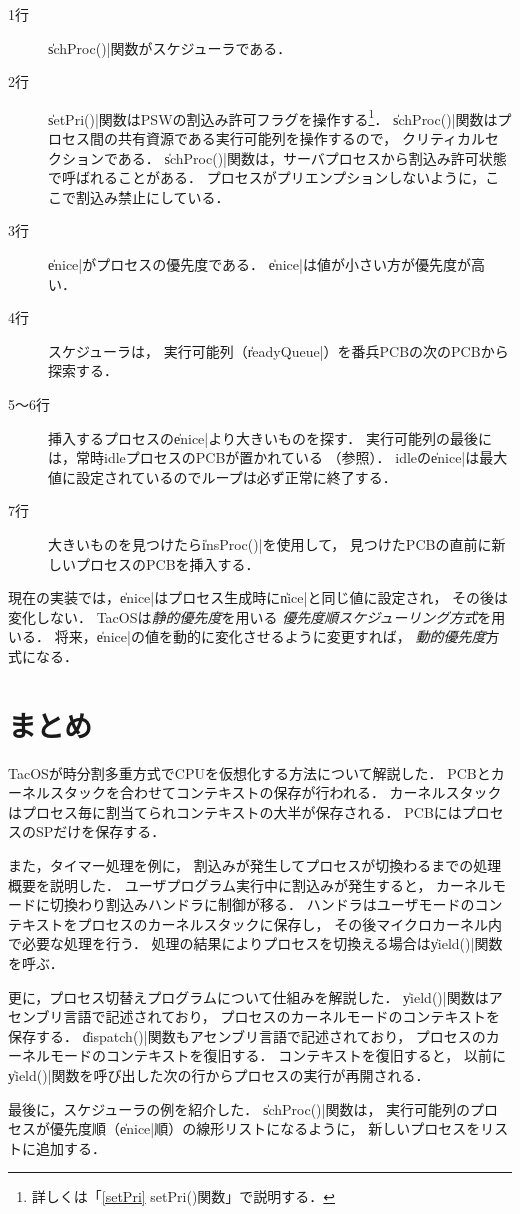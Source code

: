 

\begin{description}
\item[1行] \|schProc()|関数がスケジューラである．
\item[2行] \|setPri()|関数はPSWの割込み許可フラグを操作する\footnote{
  詳しくは「\ref{setPri} setPri()関数」で説明する．}．
  \|schProc()|関数はプロセス間の共有資源である実行可能列を操作するので，
  クリティカルセクションである．
  \|schProc()|関数は，サーバプロセスから割込み許可状態で呼ばれることがある．
  プロセスがプリエンプションしないように，ここで割込み禁止にしている．
\item[3行] \|enice|がプロセスの優先度である．
  \|enice|は値が小さい方が優先度が高い．
\item[4行] スケジューラは，
  実行可能列（\|readyQueue|）を番兵PCBの次のPCBから探索する．
\item[5〜6行] 挿入するプロセスの\|enice|より大きいものを探す．
  実行可能列の最後には，常時idleプロセスのPCBが置かれている
  （参照）．
  idleの\|enice|は最大値に設定されているのでループは必ず正常に終了する．
\item[7行] 大きいものを見つけたら\|insProc()|を使用して，
  見つけたPCBの直前に新しいプロセスのPCBを挿入する．
\end{description}

現在の実装では，\|enice|はプロセス生成時に\|nice|と同じ値に設定され，
その後は変化しない．
TacOSは\emph{静的優先度}を用いる
\emph{優先度順スケジューリング方式}を用いる．
将来，\|enice|の値を動的に変化させるように変更すれば，
\emph{動的優先度}方式になる．

\section{まとめ}
TacOSが時分割多重方式でCPUを仮想化する方法について解説した．
PCBとカーネルスタックを合わせてコンテキストの保存が行われる．
カーネルスタックはプロセス毎に割当てられコンテキストの大半が保存される．
PCBにはプロセスのSPだけを保存する．

また，タイマー処理を例に，
割込みが発生してプロセスが切換わるまでの処理概要を説明した．
ユーザプログラム実行中に割込みが発生すると，
カーネルモードに切換わり割込みハンドラに制御が移る．
ハンドラはユーザモードのコンテキストをプロセスのカーネルスタックに保存し，
その後マイクロカーネル内で必要な処理を行う．
処理の結果によりプロセスを切換える場合は\|yield()|関数を呼ぶ．

更に，プロセス切替えプログラムについて仕組みを解説した．
\|yield()|関数はアセンブリ言語で記述されており，
プロセスのカーネルモードのコンテキストを保存する．
\|dispatch()|関数もアセンブリ言語で記述されており，
プロセスのカーネルモードのコンテキストを復旧する．
コンテキストを復旧すると，
以前に\|yield()|関数を呼び出した次の行からプロセスの実行が再開される．

最後に，スケジューラの例を紹介した．
\|schProc()|関数は，
実行可能列のプロセスが優先度順（\|enice|順）の線形リストになるように，
新しいプロセスをリストに追加する．
